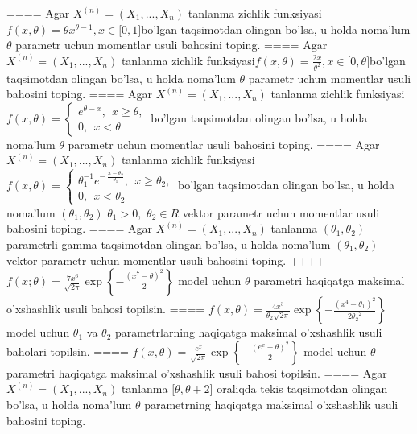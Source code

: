 ====
Agar \(X^{(n)} = \left( X_{1},...,X_{n} \right)\) tanlanma zichlik funksiyasi\(f(x,\theta) = \theta x^{\theta - 1},x \in \lbrack 0,1\rbrack\)bo'lgan taqsimotdan olingan bo'lsa, u holda noma'lum \(\theta\) parametr uchun momentlar usuli bahosini toping.
====
Agar \(X^{(n)} = \left( X_{1},...,X_{n} \right)\) tanlanma zichlik funksiyasi\(f(x,\theta) = \frac{2x}{\theta^{2}},x \in \lbrack 0,\theta\rbrack\)bo'lgan taqsimotdan olingan bo'lsa, u holda noma'lum \(\theta\) parametr uchun momentlar usuli bahosini toping.
====
Agar \(X^{(n)} = \left( X_{1},...,X_{n} \right)\) tanlanma zichlik funksiyasi\(f(x,\theta) = \left\{ \begin{matrix}
e^{\theta - x},\ \ x \geq \theta, \\
0,\ \ x < \theta
\end{matrix} \right.\ \)bo'lgan taqsimotdan olingan bo'lsa, u holda noma'lum \(\theta\) parametr uchun momentlar usuli bahosini toping.
====
Agar \(X^{(n)} = \left( X_{1},...,X_{n} \right)\) tanlanma zichlik funksiyasi\(f(x,\theta) = \left\{ \begin{matrix}
\theta_{1}^{- 1}e^{- \ \frac{x - \theta_{2}}{\theta_{1}}},\ \ x \geq \theta_{2}, \\
0,\ \ x < \theta_{2}
\end{matrix} \right.\ \)bo'lgan taqsimotdan olingan bo'lsa, u holda noma'lum \(\left( \theta_{1},\theta_{2} \right)\) \(\theta_{1} > 0,\) \(\theta_{2} \in R\) vektor parametr uchun momentlar usuli bahosini toping.
====
Agar \(X^{(n)} = \left( X_{1},...,X_{n} \right)\) tanlanma \(\left( \theta_{1},\theta_{2} \right)\) parametrli gamma taqsimotdan olingan bo'lsa, u holda noma'lum \(\left( \theta_{1},\theta_{2} \right)\) vektor parametr uchun momentlar usuli bahosini toping.
++++
\(f(x;\theta) = \frac{7x^{6}}{\sqrt{2\pi}}\exp\left\{ - \frac{(x^{7} - \theta)^{2}}{2} \right\}\) model uchun \(\theta\) parametri haqiqatga maksimal o'xshashlik usuli bahosi topilsin.
====
\(f(x,\theta) = \frac{4x^{3}}{\theta_{2}\sqrt{2\pi}}\exp\left\{ - \frac{\left( x^{4} - \theta_{1} \right)^{2}}{2{\theta_{2}}^{2}} \right\}\) model uchun \(\theta_{1}\) va \(\theta_{2}\) parametrlarning haqiqatga maksimal o'xshashlik usuli baholari topilsin.
====
\(f(x,\theta) = \frac{e^{x}}{\sqrt{2\pi}}\exp\left\{ - \frac{\left( e^{x} - \theta \right)^{2}}{2} \right\}\) model uchun \(\theta\) parametri haqiqatga maksimal o'xshashlik usuli bahosi topilsin.
====
Agar \(X^{(n)} = \left( X_{1},...,X_{n} \right)\) tanlanma \(\lbrack\theta,\theta + 2\rbrack\) oraliqda tekis taqsimotdan olingan bo'lsa, u holda noma'lum \(\theta\) parametrning haqiqatga maksimal o'xshashlik usuli bahosini toping.
